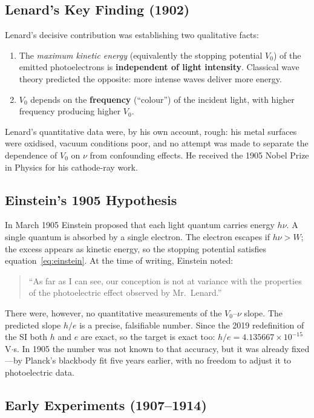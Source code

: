\documentclass[12pt]{article}
\begin{document}
\subsection{Lenard's Key Finding (1902)}

Lenard's decisive contribution was establishing two qualitative facts:
\begin{enumerate}
  \item The \emph{maximum kinetic energy} (equivalently the stopping potential
    $V_0$) of the emitted photoelectrons is \textbf{independent of light
    intensity}.  Classical wave theory predicted the opposite: more intense
    waves deliver more energy.
  \item $V_0$ depends on the \textbf{frequency} (``colour'') of the incident
    light, with higher frequency producing higher $V_0$.
\end{enumerate}
Lenard's quantitative data were, by his own account, rough: his metal surfaces
were oxidised, vacuum conditions poor, and no attempt was made to separate
the dependence of $V_0$ on $\nu$ from confounding effects.  He received the
1905 Nobel Prize in Physics for his cathode-ray work.

\subsection{Einstein's 1905 Hypothesis}

In March 1905 \citep{Einstein1905} Einstein proposed that each light quantum
carries energy $h\nu$.  A single quantum is absorbed by a single electron.
The electron escapes if $h\nu > W$; the excess appears as kinetic energy,
so the stopping potential satisfies equation~\eqref{eq:einstein}.  At the
time of writing, Einstein noted:
\begin{quote}
  ``As far as I can see, our conception is not at variance with the properties
  of the photoelectric effect observed by Mr.\ Lenard.''
\end{quote}
There were, however, no quantitative measurements of the $V_0$--$\nu$ slope.
The predicted slope $h/e$ is a precise, falsifiable number.  Since the 2019
redefinition of the SI both $h$ and $e$ are exact, so the target is exact too:
$h/e = 4.135667\times10^{-15}$\,V$\cdot$s.  In 1905 the number was not known
to that accuracy, but it was already fixed---by Planck's blackbody fit five
years earlier, with no freedom to adjust it to photoelectric data.

\subsection{Early Experiments (1907--1914)}
\end{document}
